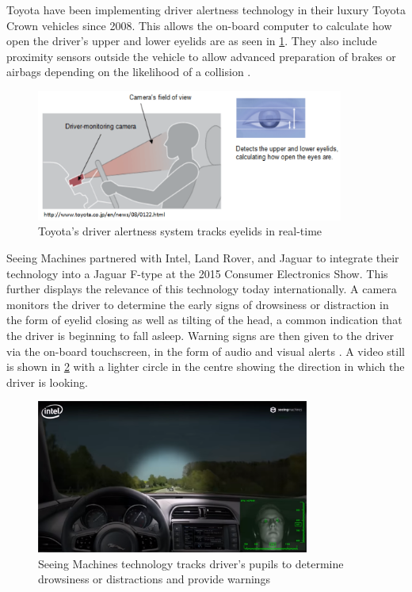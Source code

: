 Toyota have been implementing driver alertness technology in their luxury Toyota Crown vehicles since 2008. This allows the on-board computer to calculate how open the driver's upper and lower eyelids are as seen in \cref{fig:toyota_sensors}. They also include proximity sensors outside the vehicle to allow advanced preparation of brakes or airbags depending on the likelihood of a collision \cite{toyota}. 
\begin{figure}[H]
\centering
\includegraphics[width=0.9\textwidth]{images/toyota.PNG}
\vskip10pt
\caption[Toyota driver alertness system]{Toyota's driver alertness system tracks eyelids in real-time \cite{toyota}}
\label{fig:toyota_sensors}
\end{figure}
\pagebreak
Seeing Machines partnered with Intel, Land Rover, and Jaguar to integrate their technology into a Jaguar F-type at the 2015 Consumer Electronics Show. This further displays the relevance of this technology today internationally. A camera monitors the driver to determine the early signs of drowsiness or distraction in the form of eyelid closing as well as tilting of the head, a common indication that the driver is beginning to fall asleep. Warning signs are then given to the driver via the on-board touchscreen, in the form of audio and visual alerts \cite{sm_similarities}. A video still is shown in \cref{fig:sm_video} with a lighter circle in the centre showing the direction in which the driver is looking.
\begin{figure}[H]
\centering
\includegraphics[width=0.8\textwidth]{images/seeingmachines.png}
\vskip10pt
\caption[Toyota driver alertness system]{Seeing Machines technology tracks driver's pupils to determine drowsiness or distractions and provide warnings \cite{sm_similarities}}
\label{fig:sm_video}
\end{figure}

